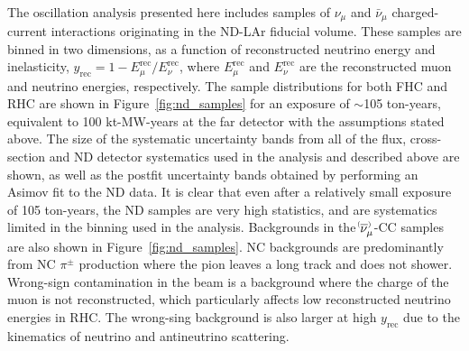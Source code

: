 \begin{figure*}
  \centering
  \\
  \caption{ND samples in both FHC and RHC, shown in the reconstructed neutrino energy and reconstructed inelasticity binning used in the analysis, shown for a $\sim$105 ton-year exposure (equivalent to a 100 kt-MW-years exposure at the FD), with an equal split between FHC and RHC. The size of the systematic uncertainty bands from all of the flux, cross-section and ND detector systematics used in the analysis are shown, as well as the postfit uncertainty bands obtained by performing an Asimov fit to the ND data. Background are also shown, which are dominated by NC events, although there is some contribution from wrong-sign \numu background events in RHC.}
 \label{fig:nd_samples}
\end{figure*}
The oscillation analysis presented here includes samples of $\nu_{\mu}$ and $\bar{\nu}_{\mu}$ charged-current interactions originating in the ND-LAr fiducial volume. These samples are binned in two dimensions, as a function of reconstructed neutrino energy and inelasticity, $y_{\mathrm{rec}} = 1 - E^{\mathrm{rec}}_{\mu}/E^{\mathrm{rec}}_{\nu}$, where $E^{\mathrm{rec}}_{\mu}$ and $E^{\mathrm{rec}}_{\nu}$ are the reconstructed muon and neutrino energies, respectively. The sample distributions for both FHC and RHC are shown in Figure~\ref{fig:nd_samples} for an exposure of $\sim$105 ton-years, equivalent to 100 kt-MW-years at the far detector with the assumptions stated above. The size of the systematic uncertainty bands from all of the flux, cross-section and ND detector systematics used in the analysis and described above are shown, as well as the postfit uncertainty bands obtained by performing an Asimov fit to the ND data. It is clear that even after a relatively small exposure of 105 ton-years, the ND samples are very high statistics, and are systematics limited in the binning used in the analysis. Backgrounds in the $\nu^{\bracketbar}_{\mu}$-CC samples are also shown in Figure~\ref{fig:nd_samples}. NC backgrounds are predominantly from NC $\pi^{\pm}$ production where the pion leaves a long track and does not shower. Wrong-sign contamination in the beam is a background where the charge of the muon is not reconstructed, which particularly affects low reconstructed neutrino energies in RHC. The wrong-sing background is also larger at high $y_{\mathrm{rec}}$ due to the kinematics of neutrino and antineutrino scattering.

